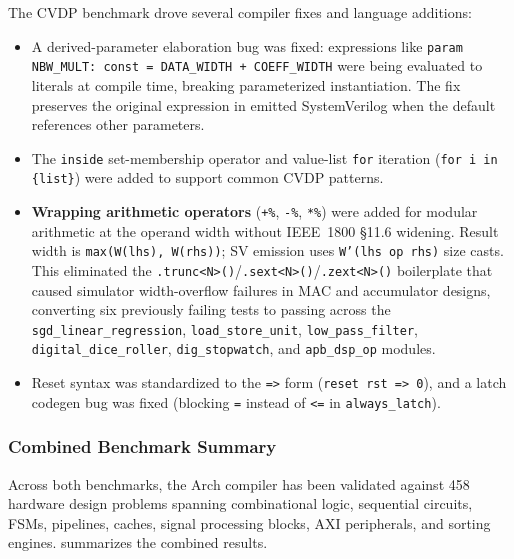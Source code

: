\documentclass[11pt,twocolumn]{article}
\begin{document}
The CVDP benchmark drove several compiler fixes and language additions:

\begin{itemize}
\item A derived-parameter elaboration bug was fixed: expressions like \texttt{param NBW\_MULT: const = DATA\_WIDTH + COEFF\_WIDTH} were being evaluated to literals at compile time, breaking parameterized instantiation. The fix preserves the original expression in emitted SystemVerilog when the default references other parameters.
\item The \texttt{inside} set-membership operator and value-list \texttt{for} iteration (\texttt{for i in \{list\}}) were added to support common CVDP patterns.
\item \textbf{Wrapping arithmetic operators} (\texttt{+\%}, \texttt{-\%}, \texttt{*\%}) were added for modular arithmetic at the operand width without IEEE~1800 §11.6 widening. Result width is \texttt{max(W(lhs), W(rhs))}; SV emission uses \texttt{W'(lhs op rhs)} size casts. This eliminated the \texttt{.trunc<N>()}/\texttt{.sext<N>()}/\texttt{.zext<N>()} boilerplate that caused simulator width-overflow failures in MAC and accumulator designs, converting six previously failing tests to passing across the \texttt{sgd\_linear\_regression}, \texttt{load\_store\_unit}, \texttt{low\_pass\_filter}, \texttt{digital\_dice\_roller}, \texttt{dig\_stopwatch}, and \texttt{apb\_dsp\_op} modules.
\item Reset syntax was standardized to the \texttt{=>} form (\texttt{reset rst => 0}), and a latch codegen bug was fixed (blocking \texttt{=} instead of \texttt{<=} in \texttt{always\_latch}).
\end{itemize}

\subsubsection{Combined Benchmark Summary}

Across both benchmarks, the Arch compiler has been validated against 458 hardware design problems spanning combinational logic, sequential circuits, FSMs, pipelines, caches, signal processing blocks, AXI peripherals, and sorting engines.  summarizes the combined results.
\end{document}
